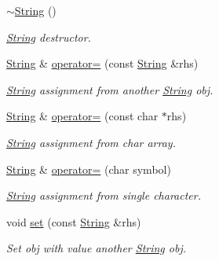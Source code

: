 \begin{DoxyCompactItemize}
\mbox{\label{class_string_ac40b2a3fb58c2d8556f5e6ff73510036}} 
\hyperlink{class_string_ac40b2a3fb58c2d8556f5e6ff73510036}{$\sim$\+String} ()
\begin{DoxyCompactList}\small\item\em \hyperlink{class_string}{String} destructor. \end{DoxyCompactList}\item 
\mbox{\label{class_string_a70b3aba8ac7a57e3bb48a52a5d64a88b}} 
\hyperlink{class_string}{String} \& \hyperlink{class_string_a70b3aba8ac7a57e3bb48a52a5d64a88b}{operator=} (const \hyperlink{class_string}{String} \&rhs)
\begin{DoxyCompactList}\small\item\em \hyperlink{class_string}{String} assignment from another \hyperlink{class_string}{String} obj. \end{DoxyCompactList}\item 
\mbox{\label{class_string_adddd36a0442459193abb9562efa94886}} 
\hyperlink{class_string}{String} \& \hyperlink{class_string_adddd36a0442459193abb9562efa94886}{operator=} (const char $\ast$rhs)
\begin{DoxyCompactList}\small\item\em \hyperlink{class_string}{String} assignment from char array. \end{DoxyCompactList}\item 
\mbox{\label{class_string_a5015638c6c8bf1ae313608b89d194788}} 
\hyperlink{class_string}{String} \& \hyperlink{class_string_a5015638c6c8bf1ae313608b89d194788}{operator=} (char symbol)
\begin{DoxyCompactList}\small\item\em \hyperlink{class_string}{String} assignment from single character. \end{DoxyCompactList}\item 
\mbox{\label{class_string_a77a7c0ae567c65fb98914a1beccfb337}} 
void \hyperlink{class_string_a77a7c0ae567c65fb98914a1beccfb337}{set} (const \hyperlink{class_string}{String} \&rhs)
\begin{DoxyCompactList}\small\item\em Set obj with value another \hyperlink{class_string}{String} obj. \end{DoxyCompactList}\item 

\end{DoxyCompactItemize}

